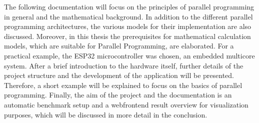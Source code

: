 The following documentation will focus on the principles of parallel programming in general and the mathematical background. In addition to the different parallel programming architectures, the various models for their implementation are also discussed. Moreover, in this thesis the prerequisites for mathematical calculation models, which are suitable for Parallel Programming, are elaborated.\newline\newline
For a practical example, the ESP32 microcontroller was chosen, an embedded multicore system. After a brief introduction to the hardware itself, further details of the project structure and the development of the application will be presented. Therefore, a short example will be explained to focus on the basics of parallel programming.\newline\newline
Finally, the aim of the project and the documentation is an automatic benchmark setup and a webfrontend result overview for visualization purposes, which will be discussed in more detail in the conclusion. 
